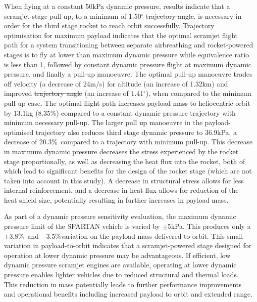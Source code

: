 \documentclass[journal]{new-aiaa}
\newcommand{\PayloadImprovement}{8.35\%}
\newcommand{\qDecrease}{20.3\%}
\newcommand{\qVariationPlus}{$+$3.8\%}
\newcommand{\qVariationMinus}{$-$3.5\%}
\newcommand{\SeparationAngleConstq}{1.50}
\newcommand{\SeparationqFiftykPa}{36.9}
\providecommand{\DIFadd}[1]{{\protect\color{blue}\uwave{#1}}} %
\providecommand{\DIFdel}[1]{{\protect\color{red}\sout{#1}}}                      %
\providecommand{\DIFaddbegin}{} %
\providecommand{\DIFaddend}{} %
\providecommand{\DIFdelbegin}{} %
\providecommand{\DIFdelend}{} %
\newcommand{\DIFscaledelfig}{0.5}
\newlength{\DIFdelgraphicswidth} %
\newlength{\DIFdelgraphicsheight} %
\newcommand{\DIFaddincludegraphics}[2][]{{\color{blue}\fbox{\DIFOincludegraphics[#1]{#2}}}} %
\newcommand{\DIFdelincludegraphics}[2][]{%
\sbox{\DIFdelgraphicsbox}{\DIFOincludegraphics[#1]{#2}}%
\settoboxwidth{\DIFdelgraphicswidth}{\DIFdelgraphicsbox} %
\settoboxtotalheight{\DIFdelgraphicsheight}{\DIFdelgraphicsbox} %
\scalebox{\DIFscaledelfig}{%
\parbox[b]{\DIFdelgraphicswidth}{\usebox{\DIFdelgraphicsbox}\\[-\baselineskip] \rule{\DIFdelgraphicswidth}{0em}}\llap{\resizebox{\DIFdelgraphicswidth}{\DIFdelgraphicsheight}{%
\setlength{\unitlength}{\DIFdelgraphicswidth}%
\begin{picture}(1,1)%
\thicklines\linethickness{2pt} %
{\color[rgb]{1,0,0}\put(0,0){\framebox(1,1){}}}%
{\color[rgb]{1,0,0}\put(0,0){\line( 1,1){1}}}%
{\color[rgb]{1,0,0}\put(0,1){\line(1,-1){1}}}%
\end{picture}%
}\hspace*{3pt}}} %
} %
\DeclareRobustCommand{\DIFaddbegin}{\DIFOaddbegin \let\includegraphics\DIFaddincludegraphics} %
\DeclareRobustCommand{\DIFaddend}{\DIFOaddend \let\includegraphics\DIFOincludegraphics} %
\DeclareRobustCommand{\DIFdelbegin}{\DIFOdelbegin \let\includegraphics\DIFdelincludegraphics} %
\DeclareRobustCommand{\DIFdelend}{\DIFOaddend \let\includegraphics\DIFOincludegraphics} %
\begin{document}
   When flying at a constant 50kPa dynamic pressure, results indicate that a scramjet-stage pull-up, to a minimum of \SeparationAngleConstq $^\circ$ \DIFdelbegin \DIFdel{trajectory angle}\DIFdelend \DIFaddbegin \DIFadd{\textcolor{red}{flight path angle}}\DIFaddend , is necessary in order for the third stage rocket to reach orbit successfully. Trajectory optimisation for maximum payload indicates that the optimal scramjet flight path for a system transitioning between separate airbreathing and rocket-powered stages is to fly at lower than maximum dynamic pressure while equivalence ratio is less than 1, followed by constant dynamic pressure flight at maximum dynamic pressure, and finally a pull-up manoeuvre. The optimal pull-up manoeuvre trades off velocity (a decrease of 24m/s) for altitude (an increase of 1.32km) and improved \DIFdelbegin \DIFdel{trajectory angle }\DIFdelend \DIFaddbegin \DIFadd{\textcolor{red}{flight path angle} }\DIFaddend (an increase of 1.41$^\circ$), when compared to the minimum pull-up case. The optimal flight path increases payload mass to heliocentric orbit by 13.1kg (\PayloadImprovement) compared to a constant dynamic pressure trajectory with minimum necessary pull-up. The larger pull up manoeuvre in the payload-optimised trajectory also reduces third stage dynamic pressure to \SeparationqFiftykPa kPa, a decrease of \qDecrease\ compared to a trajectory with minimum pull-up. This decrease in maximum dynamic pressure decreases the stress experienced by the rocket stage proportionally, as well as decreasing the heat flux into the rocket, both of which lead to significant benefits for the design of the rocket stage (which are not taken into account in this study). A decrease in structural stress allows for less internal reinforcement, and a decrease in heat flux allows for reduction of the heat shield size, potentially resulting in further increases in payload mass.


As part of a dynamic pressure sensitivity evaluation, the maximum dynamic pressure limit of the SPARTAN vehicle is varied by $\pm$5kPa. This produces only a \qVariationPlus\ and \qVariationMinus \space variation on the payload mass delivered to orbit. This small variation in payload-to-orbit indicates that a scramjet-powered stage designed for operation at lower dynamic pressure may be advantageous.
If efficient, low dynamic pressure scramjet engines are available, operating at lower dynamic pressure enables lighter vehicles due to reduced structural and thermal loads. This reduction in mass potentially leads to further performance improvements and operational benefits including increased payload to orbit and extended range.
\end{document}
